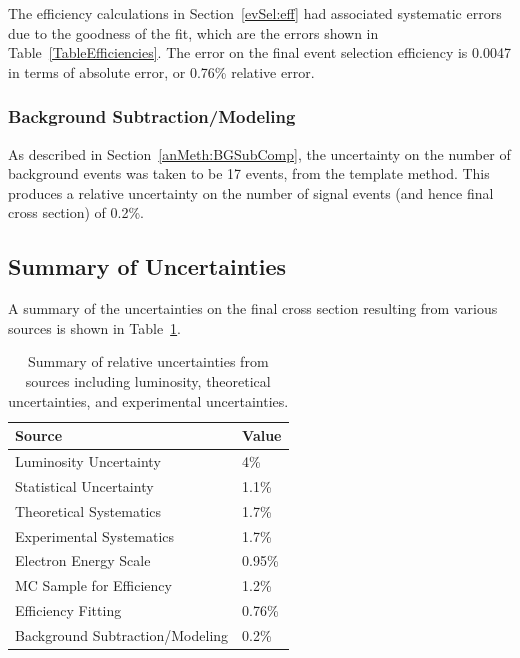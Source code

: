 
The efficiency calculations in Section~\ref{evSel:eff} 
had associated systematic errors due to the 
goodness of the fit, 
which are the errors shown in Table~\ref{TableEfficiencies}.  
The error on the final event selection 
efficiency is 0.0047 in terms of absolute error, 
or 0.76\% relative error.  


\subsubsection{Background Subtraction/Modeling}
\label{anMeth:SystsOtherBGSub}


As described in Section~\ref{anMeth:BGSubComp}, 
the uncertainty on the number of background 
events was taken to be 17 events, 
from the template method.  
This produces a relative uncertainty 
on the number of signal events 
(and hence final cross section) 
of 0.2\%.  

\subsection{Summary of Uncertainties}
\label{anMeth:SystsSummary}

A summary of the uncertainties on the final 
cross section resulting from various sources 
is shown in Table~\ref{TableSystsSummary}.  

\begin{table}[htbp]
  \begin{center}
    \caption[Summary of uncertainties]{
      Summary of relative uncertainties from sources 
      including luminosity, theoretical uncertainties, 
      and experimental uncertainties.  
    }
    \label{TableSystsSummary}
    \begin{tabular}[]{ | l | l | }
      \hline
      Source & Value  \\ \hline \hline
      Luminosity Uncertainty & 4\% \\ \hline 
      Statistical Uncertainty & 1.1\% \\ \hline 
      Theoretical Systematics & 1.7\% \\ \hline \hline 
      Experimental Systematics & 1.7\% \\ \hline \hline 
      Electron Energy Scale & 0.95\% \\ \hline 
      MC Sample for Efficiency & 1.2\% \\ \hline 
      Efficiency Fitting & 0.76\% \\ \hline 
      Background Subtraction/Modeling & 0.2\% \\ \hline 
    \end{tabular}
  \end{center}
\end{table}


